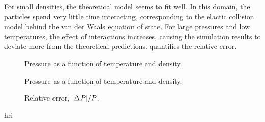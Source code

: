 \documentclass[11pt,british,a4paper]{report}
\begin{document}
For small densities, the theoretical model seems to fit well.
In this domain, the particles spend very little time interacting, corresponding to the elactic collision model behind the van der Waals equation of state. For large pressures and low temperatures, the effect of interactions increases, causing the simulation results to deviate more from the theoretical predictions.
 quantifies the relative error.



\begin{figure}[htbp]
    \centering
    \caption{Pressure as a function of temperature and density.}\label{fig:vanderWaals}
\end{figure}
\begin{figure}[htbp]
    \centering
    
    \caption{Pressure as a function of temperature and density.}\label{fig:vanderWaals}
\end{figure}
\begin{figure}[htbp]
    \centering
    \caption{Relative error, \(\abs{\Delta P}/P\).}\label{fig:Perror}
\end{figure}

\clearpage
{}
hri
\end{document}
